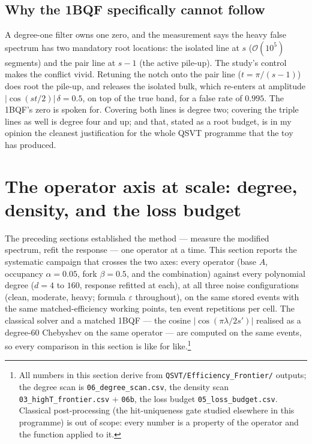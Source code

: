 \documentclass[11pt,a4paper]{article}
\begin{document}
\subsection{Why the 1BQF specifically cannot follow}
\label{sec:fit:rootbudget}

A degree-one filter owns one zero, and the measurement says the
heavy false spectrum has two mandatory root locations: the isolated
line at $s$ ($\mathcal{O}(10^5)$ segments) and the pair line at
$s-1$ (the active pile-up). The study's control makes the conflict
vivid. Retuning the notch onto the pair line ($t=\pi/(s{-}1)$) does
root the pile-up, and releases the isolated bulk, which re-enters
at amplitude $|\cos(st/2)|\,\delta=0.5$, on top of the true band,
for a false rate of $0.995$. The 1BQF's zero is spoken for.
Covering both lines is degree two; covering the triple lines as
well is degree four and up; and that, stated as a root budget, is
in my opinion the cleanest justification for the whole QSVT
programme that the toy has produced.

\section{The operator axis at scale: degree, density, and the loss
budget}
\label{sec:atscale}

The preceding sections established the method — measure the modified
spectrum, refit the response — one operator at a time. This section
reports the systematic campaign that crosses the two axes: every
operator (base $A$, occupancy $\alpha=0.05$, fork $\beta=0.5$, and
the combination) against every polynomial degree ($d=4$ to $160$,
response refitted at each), at all three noise configurations
(clean, moderate, heavy; formula $\varepsilon$ throughout), on the
same stored events with the same matched-efficiency working points,
ten event repetitions per cell. The classical solver and a matched
1BQF — the cosine $|\cos(\pi\lambda/2s')|$ realised as a degree-60
Chebyshev on the same operator — are computed on the same events, so
every comparison in this section is like for like.\footnote{All
numbers in this section derive from
\texttt{QSVT/Efficiency\_Frontier/} outputs; the degree scan is
\texttt{06\_degree\_scan.csv}, the density scan
\texttt{03\_highT\_frontier.csv} + \texttt{06b}, the loss budget
\texttt{05\_loss\_budget.csv}. Classical post-processing (the
hit-uniqueness gate studied elsewhere in this programme) is out of
scope: every number is a property of the operator and the function
applied to it.}
\end{document}
